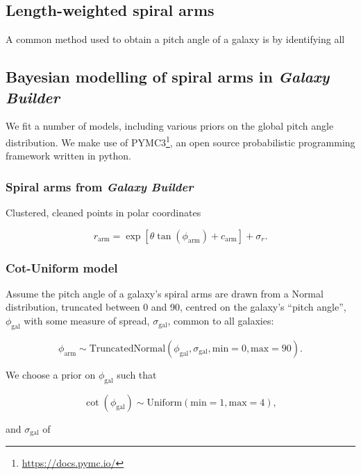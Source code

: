 
\subsection{Length-weighted spiral arms}

A common method used to obtain a pitch angle of a galaxy is by identifying all

\subsection{Bayesian modelling of spiral arms in \textit{Galaxy Builder}}

We fit a number of models, including various priors on the global pitch angle distribution. We make use of PYMC3\footnote{\url{https://docs.pymc.io/}}, an open source probabilistic programming framework written in python.

\subsubsection{Spiral arms from \textit{Galaxy Builder}}

Clustered, cleaned points in polar coordinates

$$ r_\mathrm{arm} = \exp\left[\theta\tan(\phi_\mathrm{arm}) + c_\mathrm{arm}\right] + \sigma_r.$$

\subsubsection{Cot-Uniform model}

Assume the pitch angle of a galaxy's spiral arms are drawn from a Normal distribution, truncated between 0 and 90, centred on the galaxy's ``pitch angle'', $\phi_\mathrm{gal}$ with some measure of spread, $\sigma_\mathrm{gal}$, common to all galaxies:

\begin{equation}
\phi_\mathrm{arm} \sim \mathrm{TruncatedNormal}(\phi_\mathrm{gal}, \sigma_\mathrm{gal}, \mathrm{min}=0, \mathrm{max}=90).
\end{equation}

We choose a prior on $\phi_\mathrm{gal}$ such that

\begin{equation}
\cot\left(\phi_\mathrm{gal}\right) \sim \mathrm{Uniform}(\mathrm{min}=1, \mathrm{max}=4),
\end{equation}

and $\sigma_\mathrm{gal}$ of

